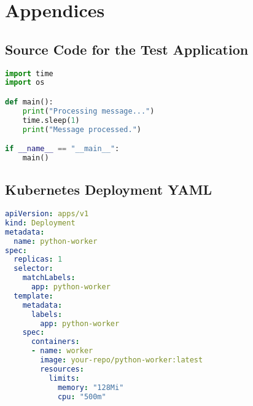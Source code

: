 \chapter{Appendices}

\section{Source Code for the Test Application}
\label{app:source_code}
\begin{lstlisting}[language=Python, caption={Sample Python worker.}]
import time
import os

def main():
    print("Processing message...")
    time.sleep(1)
    print("Message processed.")

if __name__ == "__main__":
    main()
\end{lstlisting}

\section{Kubernetes Deployment YAML}
\label{app:yaml}
\begin{lstlisting}[language=yaml, caption={Deployment YAML for the test application.}]
apiVersion: apps/v1
kind: Deployment
metadata:
  name: python-worker
spec:
  replicas: 1
  selector:
    matchLabels:
      app: python-worker
  template:
    metadata:
      labels:
        app: python-worker
    spec:
      containers:
      - name: worker
        image: your-repo/python-worker:latest
        resources:
          limits:
            memory: "128Mi"
            cpu: "500m"
\end{lstlisting} 